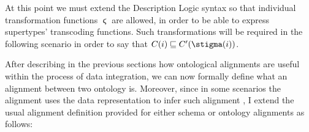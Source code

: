 At this point we must extend the Description Logic syntax so that individual transformation functions $\stigma$ are allowed, in order to be able to express supertypes' transcoding functions. Such transformations will be required in the following scenario in order to say that  $C(i)\sqsubseteq C'(\transcoding(i))$. %




After describing in the previous sections how ontological alignments are useful within the process of data integration, we can now formally define what an alignment between two ontology is. Moreover, since in some scenarios the alignment uses the data representation to infer such alignment \cite{Aligon201520}, I extend the usual alignment definition provided for either schema or ontology alignments \cite{euzenat2013d,GrossHKR11} as follows:

%
%
%
%

